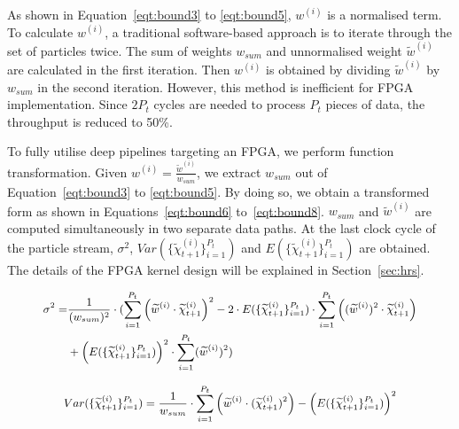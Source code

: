 As shown in Equation~\ref{eqt:bound3} to \ref{eqt:bound5}, ${w}^{(i)}$ is a normalised term. 
To calculate $w^{(i)}$, a traditional software-based approach is to iterate through the set of particles twice.
The sum of weights $w_{sum}$ and unnormalised weight $\widetilde{w}^{(i)}$ are calculated in the first iteration.
Then $w^{(i)}$ is obtained by dividing $\widetilde{w}^{(i)}$ by $w_{sum}$ in the second iteration.
However, this method is inefficient for FPGA implementation.
Since $2P_t$ cycles are needed to process $P_t$ pieces of data, the throughput is reduced to 50\%.

To fully utilise deep pipelines targeting an FPGA, we perform function transformation.
Given ${w}^{(i)} = \frac{\widetilde{w}^{(i)}}{w_{sum}}$, we extract $w_{sum}$ out of Equation~\ref{eqt:bound3} to \ref{eqt:bound5}.
By doing so, we obtain a transformed form as shown in Equations~\ref{eqt:bound6} to~\ref{eqt:bound8}.
$w_{sum}$ and $\widetilde{w}^{(i)}$ are computed simultaneously in two separate data paths.
At the last clock cycle of the particle stream, $\sigma^2$, $Var(\{\widetilde{\chi}_{t+1}^{(i)}\}^{P_t}_{i=1})$ and $E(\{\widetilde{\chi}_{t+1}^{(i)}\}^{P_t}_{i=1})$ are obtained.
The details of the FPGA kernel design will be explained in Section~\ref{sec:hrs}.

\begin{eqnarray}
\small
\begin{aligned}
\sigma^2 = & \frac{1}{(w_{sum})^2} \cdot ( \sum_{i=1}^{P_{t}}\left(\widetilde{w}^{(i)} \cdot \widetilde{\chi}_{t+1}^{(i)} \right)^2 - 2 \cdot E(\{\widetilde{\chi}_{t+1}^{(i)}\}^{P_t}_{i=1}) \cdot \sum_{i=1}^{P_{t}} \left ( (\widetilde{w}^{(i)})^2 \cdot \widetilde{\chi}_{t+1}^{(i)} \right )\\
& + \left(E(\{\widetilde{\chi}_{t+1}^{(i)}\}^{P_t}_{i=1})\right)^2 \cdot \sum_{i=1}^{P_{t}}(\widetilde{w}^{(i)})^2 )
\end{aligned}
\label{eqt:bound6}
\end{eqnarray}

\begin{equation}
\small
\begin{aligned}
Var(\{\widetilde{\chi}_{t+1}^{(i)}\}^{P_t}_{i=1}) = \frac{1}{w_{sum}} \cdot \sum_{i=1}^{P_{t}} \left ( \widetilde{w}^{(i)} \cdot (\widetilde{\chi}_{t+1}^{(i)})^2 \right ) - \left( E(\{\widetilde{\chi}_{t+1}^{(i)}\}^{P_t}_{i=1}) \right)^2
\end{aligned}
\label{eqt:bound7}
\end{equation}

